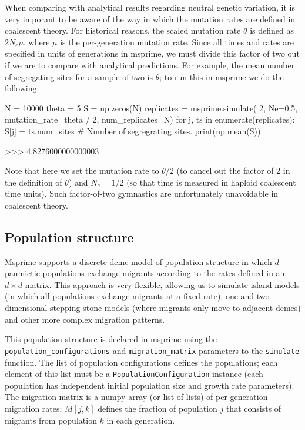 \documentclass[graybox]{svmult}
\begin{document}
When comparing with analytical results regarding neutral genetic
variation, it is very imporant to be aware of the way in which the
mutation rates are defined in coalescent theory. For historical reasons,
the scaled mutation rate \(\theta\) is defined as \(2N_e \mu\), where
\(\mu\) is the per-generation mutation rate. Since all times and rates
are specified in units of generations in msprime, we must divide this
factor of two out if we are to compare with analytical predictions. For
example, the mean number of segregating sites for a sample of two is
\(\theta\); to run this in msprime we do the following:

\begin{pythoncode}
N = 10000
theta = 5
S = np.zeros(N)
replicates = msprime.simulate(
    2, Ne=0.5, mutation_rate=theta / 2, num_replicates=N)
for j, ts in enumerate(replicates):
    S[j] = ts.num_sites  # Number of segregrating sites.
print(np.mean(S))

>>> 4.8276000000000003
\end{pythoncode}

    Note that here we set the mutation rate to \(\theta / 2\) (to cancel out
the factor of 2 in the definition of \(\theta\)) and \(N_e = 1/2\) (so
that time is measured in haploid coalescent time units). Such
factor-of-two gymnastics are unfortunately unavoidable in coalescent
theory.

\subsection{Population structure}\label{population-structure}

Msprime supports a discrete-deme model of population structure in which
\(d\) panmictic populations exchange migrants according to the rates
defined in an \(d \times d\) matrix. This approach is very flexible,
allowing us to simulate island models (in which all populations exchange
migrants at a fixed rate), one and two dimensional stepping stone models
(where migrants only move to adjacent demes) and other more complex
migration patterns.

This population structure is declared in msprime using the
\texttt{population\_configurations} and \texttt{migration\_matrix}
parameters to the \texttt{simulate} function. The list of population
configurations defines the populations; each element of this list must
be a \texttt{PopulationConfiguration} instance (each population has
independent initial population size and growth rate parameters). The
migration matrix is a numpy array (or list of lists) of per-generation
migration rates; \(M[j,k]\) defines the fraction of population \(j\)
that consists of migrants from population \(k\) in each generation.
\end{document}
